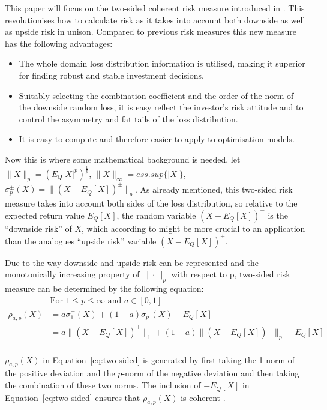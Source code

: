 \documentclass{pdfmx4020}
\begin{document}
  This paper will focus on the two-sided coherent risk measure introduced in \cite{two_sided_risk}. This revolutionises how to calculate risk as it takes into account both downside as well as upside risk in unison. Compared to previous risk measures this new measure has the following advantages:
  \begin{itemize}
    \item The whole domain loss distribution information is utilised, making it superior for finding robust and stable investment decisions.
    \item Suitably selecting the combination coefficient and the order of the norm of the downside random loss, it is easy reflect the investor's risk attitude and to control the asymmetry and fat tails of the loss distribution.
    \item It is easy to compute and therefore easier to apply to optimisation models.
  \end{itemize}

  Now this is where some mathematical background is needed, let $\| X \|_p = (E_Q |X|^p)^{\frac{1}{p}}$, $\|X\|_\infty = ess.sup \{ |X|\}$, $\sigma_p^{\pm} (X) = \|(X-E_Q[X])^{\pm}\|_p$. As already mentioned, this two-sided risk measure takes into account both sides of the loss distribution, so relative to the expected return value $E_Q[X]$, the random variable $(X-E_Q[X])^-$ is the ``downside risk'' of $X$, which according to \cite{two_sided_risk} might be more crucial to an application than the analogues ``upside risk'' variable $(X-E_Q[X])^+$.

  Due to the way downside and upside risk can be represented and the monotonically increasing property of $\| \cdot \|_p$ with respect to p, two-sided risk measure can be determined by the following equation:
  \begin{equation} \label{eq:two-sided}
    \begin{split}
      & \text{For } 1 \leq p \leq \infty \text{ and } a \in [0,1] \\
      \rho_{a,p}(X) & = a \sigma_1^+(X) + (1-a)\sigma_p^-(X) - E_Q[X ]\\
      & = a \|(X-E_Q[X])^+\|_1 + (1-a) \|(X-E_Q[X])^-\|_p - E_Q[X] \\
    \end{split}
  \end{equation}


  $\rho_{a,p}(X)$ in Equation~\ref{eq:two-sided} is generated by first taking the 1-norm of the positive deviation and the $p$-norm of the negative deviation and then taking the combination of these two norms. The inclusion of $- E_Q[X]$ in Equation~\ref{eq:two-sided} ensures that $\rho_{a,p}(X)$ is coherent \cite{two_sided_risk}. 
\end{document}
